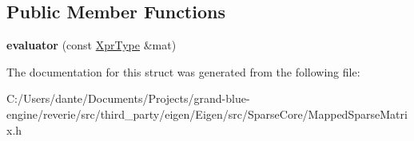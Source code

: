 \subsection*{Public Member Functions}
\begin{DoxyCompactItemize}
\item 
\mbox{\label{struct_eigen_1_1internal_1_1evaluator_3_01_mapped_sparse_matrix_3_01___scalar_00_01___options_00_01___storage_index_01_4_01_4_a2c3f5654d832a7550a8e8cfc07d671f8}} 
{\bfseries evaluator} (const \mbox{\hyperlink{class_eigen_1_1_mapped_sparse_matrix}{Xpr\+Type}} \&mat)
\end{DoxyCompactItemize}


The documentation for this struct was generated from the following file\+:\begin{DoxyCompactItemize}
\item 
C\+:/\+Users/dante/\+Documents/\+Projects/grand-\/blue-\/engine/reverie/src/third\+\_\+party/eigen/\+Eigen/src/\+Sparse\+Core/Mapped\+Sparse\+Matrix.\+h\end{DoxyCompactItemize}
